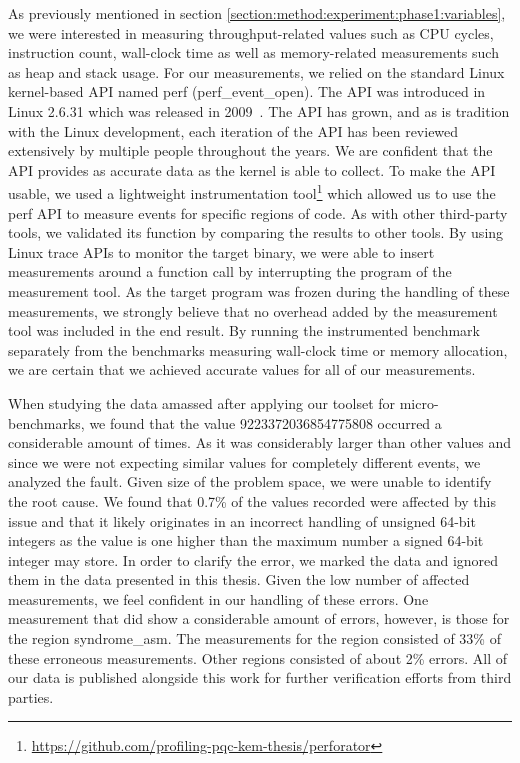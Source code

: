 As previously mentioned in section \ref{section:method:experiment:phase1:variables}, we were interested in measuring throughput-related values such as CPU cycles, instruction count, wall-clock time as well as memory-related measurements such as heap and stack usage. For our measurements, we relied on the standard Linux kernel-based API named perf (perf\_event\_open). The API was introduced in Linux 2.6.31 which was released in 2009~\cite{linux:perf-released}. The API has grown, and as is tradition with the Linux development, each iteration of the API has been reviewed extensively by multiple people throughout the years. We are confident that the API provides as accurate data as the kernel is able to collect. To make the API usable, we used a lightweight instrumentation tool\footnote{\url{https://github.com/profiling-pqc-kem-thesis/perforator}} which allowed us to use the perf API to measure events for specific regions of code. As with other third-party tools, we validated its function by comparing the results to other tools. By using Linux trace APIs to monitor the target binary, we were able to insert measurements around a function call by interrupting the program of the measurement tool. As the target program was frozen during the handling of these measurements, we strongly believe that no overhead added by the measurement tool was included in the end result. By running the instrumented benchmark separately from the benchmarks measuring wall-clock time or memory allocation, we are certain that we achieved accurate values for all of our measurements.

When studying the data amassed after applying our toolset for micro-benchmarks, we found that the value 9223372036854775808 occurred a considerable amount of times. As it was considerably larger than other values and since we were not expecting similar values for completely different events, we analyzed the fault. Given size of the problem space, we were unable to identify the root cause. We found that 0.7\% of the values recorded were affected by this issue and that it likely originates in an incorrect handling of unsigned 64-bit integers as the value is one higher than the maximum number a signed 64-bit integer may store. In order to clarify the error, we marked the data and ignored them in the data presented in this thesis. Given the low number of affected measurements, we feel confident in our handling of these errors. One measurement that did show a considerable amount of errors, however, is those for the region syndrome\_asm. The measurements for the region consisted of 33\% of these erroneous measurements. Other regions consisted of about 2\% errors. All of our data is published alongside this work for further verification efforts from third parties.

